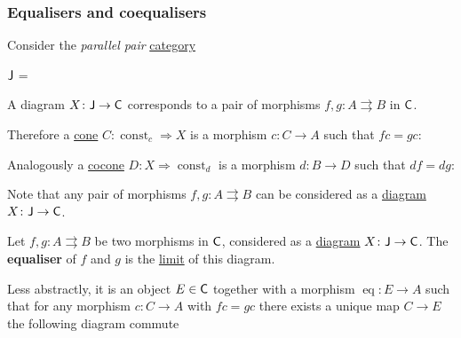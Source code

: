 \documentclass[../../main]{subfiles}
\begin{document}
\subsubsection{Equalisers and coequalisers}

Consider the \textit{parallel pair} \hyperref[def:category]{category}
\begin{center}
  \(\mathsf{J}\) = 
\end{center}
A diagram \(X\colon \mathsf{J} \to \mathsf{C}\) corresponds to a pair of morphisms \(f, g\colon A \rightrightarrows B\) in \(\mathsf{C}\).

Therefore a \hyperref[def:cone]{cone} \(C\colon \operatorname{const}_{c} \Rightarrow X\) is a morphism \(c\colon C \to A\) such that \(fc = gc\):
\begin{center}
\end{center}
Analogously a \hyperref[def:cocone]{cocone} \(D\colon X \Rightarrow \operatorname{const}_{d}\) is a morphism \(d\colon B \to D\) such that \(df = dg\):
\begin{center}
\end{center}

Note that any pair of morphisms \(f, g\colon A \rightrightarrows B\) can be considered as a \hyperref[def:diagram]{diagram} \(X\colon \mathsf{J} \to \mathsf{C}\).

\begin{definition}[Equaliser]\label{def:equaliser}
  Let \(f, g\colon A \rightrightarrows B\) be two morphisms in \(\mathsf{C}\), considered as a \hyperref[def:diagram]{diagram} \(X\colon \mathsf{J} \to \mathsf{C}\).
  The \textbf{equaliser} of \(f\) and \(g\) is the \hyperref[def:categorical-limit]{limit} of this diagram.
  
  Less abstractly, it is an object \(E \in \mathsf{C}\) together with a morphism \(\operatorname{eq}\colon E \to A\) such that for any morphism \(c\colon C \to A\) with \(fc = gc\) there exists a unique map \(C \to E\) the following diagram commute
  \begin{center}
  \end{center}
\end{definition}
\end{document}
